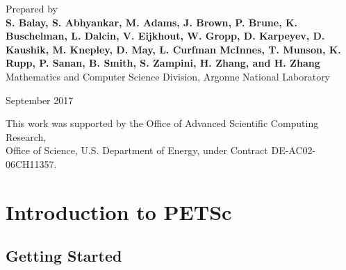 \vspace*{1in}
\noindent Prepared by \\
{\bf S. Balay, S. Abhyankar, M. Adams, J. Brown, P. Brune, K. Buschelman, L. Dalcin, V. Eijkhout, W. Gropp, D. Karpeyev,
D. Kaushik, M. Knepley, D. May, L. Curfman McInnes, T. Munson, K. Rupp, P. Sanan, B. Smith, S. Zampini, H. Zhang, and H. Zhang}\\
Mathematics and Computer Science Division, Argonne National Laboratory

\vspace*{30pt}
\noindent September 2017

\vspace*{20pt}
\noindent This work was supported by the Office of Advanced Scientific Computing Research, \\
Office of Science, U.S. Department of Energy, under Contract DE-AC02-06CH11357.


\cleardoublepage
\pagestyle{fancy}
\vspace{1in}
\date{\today}



\cleardoublepage



\medskip \medskip

\cleardoublepage




\cleardoublepage
\label{tableofcontents}
\tableofcontents

\cleardoublepage
\part{Introduction to PETSc}
\label{part_intro}
\cleardoublepage
\chapter{Getting Started}


\cleardoublepage
